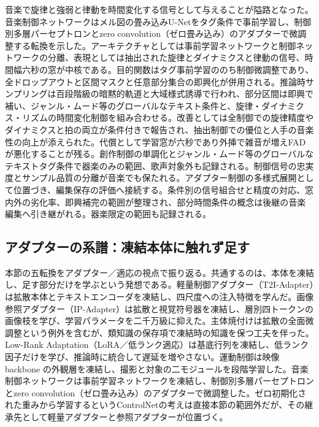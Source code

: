 \documentclass[lualatex,a4paper,10pt]{jlreq}
\begin{document}
音楽で旋律と強弱と律動を時間変化する信号として与えることが隘路となった。音楽制御ネットワークはメル図の畳み込みU-Netをタグ条件で事前学習し、制御別多層パーセプトロンとzero convolution（ゼロ畳み込み）のアダプターで微調整する転換を示した\autocite{btd043}。アーキテクチャとしては事前学習ネットワークと制御ネットワークの分離、表現としては抽出された旋律とダイナミクスと律動の信号、時間幅六秒の窓が中核である\autocite{btd043}。目的関数はタグ事前学習ののち制御微調整であり、全ドロップアウトと区間マスクと任意部分集合の即興化が併用される\autocite{btd043}。推論時サンプリングは百段階級の暗黙的軌道と大域様式誘導で行われ、部分区間は即興で補い、ジャンル・ムード等のグローバルなテキスト条件と、旋律・ダイナミクス・リズムの時間変化制御を組み合わせる\autocite{btd043}。改善としては全制御での旋律精度やダイナミクスと拍の両立が条件付きで報告され、抽出制御での優位と人手の音楽性の向上が添えられた\autocite{btd043}。代償として学習窓が六秒であり外挿で雑音が増えFADが悪化することが残る\autocite{btd043}。創作制御の単調化とジャンル・ムード等のグローバルなテキストタグ条件で器楽のみの範囲、歌声対象外も記録される。制御信号の忠実度とサンプル品質の分離が音楽でも保たれる。アダプター制御の多様式展開として位置づき、編集保存の評価へ接続する。条件別の信号組合せと精度の対応、窓内外の劣化率、即興補完の範囲が整理され、部分時間条件の概念は後継の音楽編集へ引き継がれる\autocite{btd043}。器楽限定の範囲も記録される。

\subsection{アダプターの系譜：凍結本体に触れず足す}
本節の五転換をアダプター／適応の視点で振り返る。共通するのは、本体を凍結し、足す部分だけを学ぶという発想である。軽量制御アダプター（T2I-Adapter）は拡散本体とテキストエンコーダを凍結し、四尺度への注入特徴を学んだ\autocite{btd037}。画像参照アダプター（IP-Adapter）は拡散と視覚符号器を凍結し、層別四トークンの画像枝を学び、学習パラメータを二千万級に抑えた\autocite{btd038}。主体焼付けは拡散の全面微調整という例外を含むが、類知識の保存項で凍結時の知識を保つ工夫を伴った\autocite{btd039}。Low-Rank Adaptation（LoRA／低ランク適応）は基底行列を凍結し、低ランク因子だけを学び、推論時に統合して遅延を増やさない\autocite{btd040}。運動制御は映像 backbone の外観層を凍結し、撮影と対象の二モジュールを段階学習した\autocite{btd042}。音楽制御ネットワークは事前学習ネットワークを凍結し、制御別多層パーセプトロンとzero convolution（ゼロ畳み込み）のアダプターで微調整した\autocite{btd043}。ゼロ初期化された重みから学習するというControlNetの考え\autocite{btd036}は直接本節の範囲外だが、その継承先として軽量アダプターと参照アダプターが位置づく。
\end{document}
